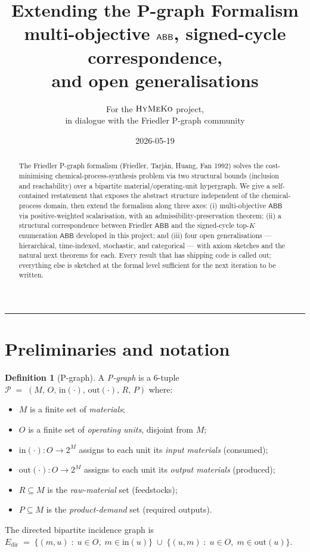 \documentclass[11pt,a4paper]{article}
\title{Extending the P-graph Formalism\\[4pt]
       \large\normalfont
       multi-objective $\abb$, signed-cycle correspondence,\\
       and open generalisations}
\author{For the $\textsc{HyMeKo}${} project,\\
        in dialogue with the Friedler P-graph community}
\date{2026-05-19}
\theoremstyle{plain}
\theoremstyle{definition}
\newtheorem{definition}[theorem]{Definition}
\newcommand{\abb}{\textsf{ABB}}
\newcommand{\inset}[1]{\mathrm{in}(#1)}
\newcommand{\outset}[1]{\mathrm{out}(#1)}
\begin{document}
\maketitle

\begin{abstract}\small
The Friedler P-graph formalism (Friedler, Tarj\'an, Huang, Fan 1992)
solves the cost-minimising chemical-process-synthesis problem via
two structural bounds (inclusion and reachability) over a bipartite
material/operating-unit hypergraph. We give a self-contained
restatement that exposes the abstract structure independent of the
chemical-process domain, then extend the formalism along three axes:
(i) multi-objective $\abb$ via positive-weighted scalarisation, with
an admissibility-preservation theorem; (ii) a structural
correspondence between Friedler $\abb$ and the signed-cycle
top-$K$ enumeration $\abb$ developed in this project; and
(iii) four open generalisations --- hierarchical, time-indexed,
stochastic, and categorical --- with axiom sketches and the natural
next theorems for each. Every result that has shipping code is
called out; everything else is sketched at the formal level
sufficient for the next iteration to be written.
\end{abstract}

\tableofcontents

\vspace{6pt}\hrule\vspace{6pt}

\section{Preliminaries and notation}
\label{sec:prelim}

\begin{definition}[P-graph]
\label{def:pgraph}
A \emph{P-graph} is a 6-tuple
$
\mathcal{P} \;=\; (M,\, O,\, \inset{\cdot},\, \outset{\cdot},\, R,\, P)
$
where:
\begin{itemize}
\item $M$ is a finite set of \emph{materials};
\item $O$ is a finite set of \emph{operating units}, disjoint from $M$;
\item $\inset{\cdot} : O \to 2^M$ assigns to each unit its
      \emph{input materials} (consumed);
\item $\outset{\cdot} : O \to 2^M$ assigns to each unit its
      \emph{output materials} (produced);
\item $R \subseteq M$ is the \emph{raw-material} set (feedstocks);
\item $P \subseteq M$ is the \emph{product-demand} set
      (required outputs).
\end{itemize}
The directed bipartite incidence graph is
$
E_{\text{dir}} \;=\;
\{ (m, u) \;:\; u \in O,\; m \in \inset{u}\} \;\cup\;
\{ (u, m) \;:\; u \in O,\; m \in \outset{u}\}.
$
\end{definition}
\end{document}
